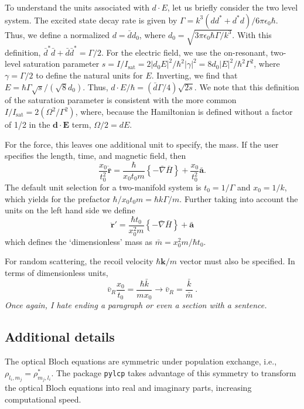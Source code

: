 \documentclass[final,5p,times,twocolumn]{elsarticle}
\newcounter{bla}
\begin{document}
To understand the units associated with $d\cdot E$, let us briefly consider the two level system.  The excited state decay rate is given by $\Gamma = k^3(d d^*+d^* d)/6 \pi\epsilon_0\hbar$.  Thus, we define a normalized $d=\bar{d} d_0$, where $d_0 = \sqrt{3 \pi \epsilon_0 \hbar \Gamma/k^3}$.  With this definition, $\bar{d}^*\bar{d}+\bar{d}\bar{d}^* = \Gamma/2$.  For the electric field, we use the on-resonant, two-level saturation parameter $s = I/I_\text{sat} = 2|d_0 E|^2/\hbar^2|\gamma|^2 = 8 d_0 |E|^2/\hbar^2\Gamma^2$, where $\gamma = \Gamma/2$ to define the natural units for $E$.  Inverting, we find that $E = \hbar \Gamma \sqrt{s}/(\sqrt{8} d_0)$.  Thus, $d\cdot E/\hbar = (\bar{d} \Gamma/4) \sqrt{2 s}$.  We note that this definition of the saturation parameter is consistent with the more common $I/I_\text{sat} = 2(\Omega^2/\Gamma^2)$, where, because the Hamiltonian is defined without a factor of 1/2 in the $\mathbf{d}\cdot \mathbf{E}$ term, $\Omega/2=dE$.

For the force, this leaves one additional unit to specify, the mass.  If the
user specifies the length, time, and magnetic field, then
\begin{equation}
    \frac{x_0}{t_0^2} \ddot{\bar{\mathbf{r}}} = \frac{\hbar}{x_0 t_0 m}\left\{ -\bar{\nabla} \bar{H}\right\} + \frac{x_0}{t_0^2}\bar{\mathbf{a}}.
\end{equation}
The default unit selection for a two-manifold system is $t_0=1/\Gamma$ and $x_0=1/k$, which yields for the prefactor $\hbar/x_0 t_0 m = \hbar k \Gamma/m$.   Further taking into account the units on the left hand side we define
\begin{equation}
	\ddot{\mathbf{r}}' = \frac{\hbar t_0}{x_0^2 m}\left\{ -\bar{\nabla} \bar{H}\right\} + \bar{\mathbf{a}}
\end{equation}
which defines the `dimensionless' mass as $\bar{m} = x_0^2 m/\hbar t_0$.

For random scattering, the recoil velocity $\hbar \mathbf{k}/m$ vector must also be specified.  In terms of dimensionless units,
\begin{equation}
	\bar{v}_R \frac{x_0}{t_0} = \frac{\hbar\bar{k}}{m x_0} \rightarrow \bar{v}_R = \frac{\bar{k}}{\bar{m}}\ .
\end{equation}
{\it Once again, I hate ending a paragraph or even a section with a sentence.}

\subsection{Additional details}
The optical Bloch equations are symmetric under population exchange, i.e., $\rho_{l_i, m_j} = \rho^*_{m_j, l_i}$.  The package {\tt pylcp} takes advantage of this symmetry to transform the optical Bloch equations into real and imaginary parts, increasing computational speed.
\end{document}
